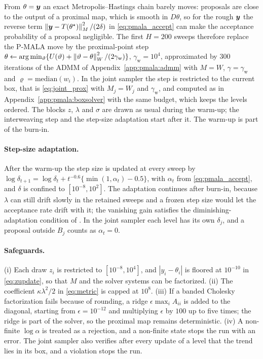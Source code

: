 From $\theta = \bm{y}$ an exact Metropolis--Hastings chain barely moves: proposals are close to the output of a proximal map, which is smooth in $D\theta$, so for the rough $\bm{y}$ the reverse term $\left\lVert\bm{y} - T(\theta^\star)\right\rVert_M^2/(2\delta)$ in \eqref{eq:pmala_accept} can make the acceptance probability of a proposal negligible. The first $H = 200$ sweeps therefore replace the P-MALA move by the proximal-point step $\theta \leftarrow \arg\min_{\vartheta}\{U(\vartheta) + \left\lVert\vartheta - \theta\right\rVert_W^2/(2\gamma_{\mathrm{w}})\}$, $\gamma_{\mathrm{w}} = 10^4$, approximated by $300$ iterations of the ADMM of Appendix~\ref{app:pmala:admm} with $M = W$, $\gamma = \gamma_{\mathrm{w}}$ and $\varrho = \mathrm{median}(w_i)$. In the joint sampler the step is restricted to the current box, that is \eqref{eq:joint_prox} with $M_j = W_j$ and $\gamma_{\mathrm{w}}$, and computed as in Appendix~\ref{app:pmala:boxsolver} with the same budget, which keeps the levels ordered. The blocks $z$, $\lambda$ and $\sigma$ are drawn as usual during the warm-up; the interweaving step and the step-size adaptation start after it. The warm-up is part of the burn-in.

\paragraph{Step-size adaptation.} After the warm-up the step size is updated at every sweep by $\log\delta_{t+1} = \log\delta_t + t^{-0.6}\{\min(1, \alpha_t) - 0.5\}$, with $\alpha_t$ from \eqref{eq:pmala_accept}, and $\delta$ is confined to $[10^{-8}, 10^{2}]$. The adaptation continues after burn-in, because $\lambda$ can still drift slowly in the retained sweeps and a frozen step size would let the acceptance rate drift with it; the vanishing gain satisfies the diminishing-adaptation condition of \citet{roberts2007coupling}. In the joint sampler each level has its own $\delta_j$, and a proposal outside $B_j$ counts as $\alpha_t = 0$.

\paragraph{Safeguards.} (i) Each draw $z_i$ is restricted to $[10^{-8}, 10^{4}]$, and $|y_i - \theta_i|$ is floored at $10^{-10}$ in \eqref{eq:zupdate}, so that $M$ and the solver systems can be factorized. (ii) The coefficient $\kappa\lambda^2/2$ in \eqref{eq:metric} is capped at $10^{8}$. (iii) If a banded Cholesky factorization fails because of rounding, a ridge $\epsilon\max_i A_{ii}$ is added to the diagonal, starting from $\epsilon = 10^{-12}$ and multiplying $\epsilon$ by $100$ up to five times; the ridge is part of the solver, so the proximal map remains deterministic. (iv) A non-finite $\log\alpha$ is treated as a rejection, and a non-finite state stops the run with an error. The joint sampler also verifies after every update of a level that the trend lies in its box, and a violation stops the run.

